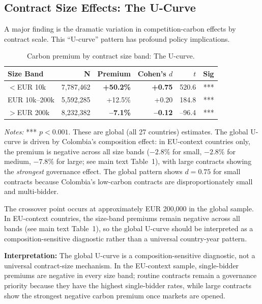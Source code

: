 \documentclass[11pt]{article}
\newcommand{\tabnoteblock}[1]{%
    \par\vspace{0.45em}%
    \begin{minipage}{0.98\linewidth}
    \footnotesize\raggedright #1
    \end{minipage}\par
}
\newcommand{\tabnotes}[1]{\tabnoteblock{\textit{Notes:} #1}}
\begin{document}
\subsection{Contract Size Effects: The U-Curve}

A major finding is the dramatic variation in competition-carbon effects by contract scale. This ``U-curve'' pattern has profound policy implications.

\begin{table}[H]
\centering
\caption{Carbon premium by contract size band: The U-curve.}
\label{tab:size}
\begin{tabular}{lrrrrr}
\toprule
\textbf{Size Band} & \textbf{N} & \textbf{Premium} & \textbf{Cohen's $d$} & \textbf{$t$} & \textbf{Sig} \\
\midrule
$<$EUR 10k & 7,787,462 & \textbf{+50.2\%} & \textbf{+0.75} & 520.6 & *** \\
EUR 10k--200k & 5,592,285 & +12.5\% & +0.20 & 184.8 & *** \\
$>$EUR 200k & 8,232,382 & \textbf{--7.1\%} & \textbf{--0.12} & --96.4 & *** \\
\bottomrule
\end{tabular}

\tabnotes{*** $p < 0.001$. These are global (all 27 countries) estimates. The global U-curve is driven by Colombia's composition effect: in EU-context countries only, the premium is negative across all size bands ($-2.8\%$ for small, $-2.8\%$ for medium, $-7.8\%$ for large; see main text Table~1), with large contracts showing the \textit{strongest} governance effect. The global pattern shows $d = 0.75$ for small contracts because Colombia's low-carbon contracts are disproportionately small and multi-bidder.
}
\end{table}

The crossover point occurs at approximately EUR 200,000 in the global sample. In EU-context countries, the size-band premiums remain negative across all bands (see main text Table~1), so the global U-curve should be interpreted as a composition-sensitive diagnostic rather than a universal country-year pattern.

\textbf{Interpretation:} The global U-curve is a composition-sensitive diagnostic, not a universal contract-size mechanism. In the EU-context sample, single-bidder premiums are negative in every size band; routine contracts remain a governance priority because they have the highest single-bidder rates, while large contracts show the strongest negative carbon premium once markets are opened.
\end{document}
